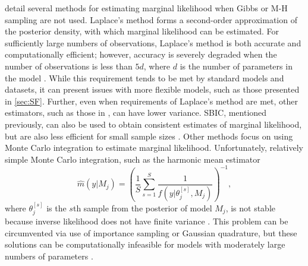 \documentclass[twocolumn]{article}
\begin{document}
\cite{KassRaftery} detail several methods for estimating marginal likelihood when Gibbs or M-H sampling are not used. Laplace's method forms a second-order approximation of the posterior density, with which marginal likelihood can be estimated. For sufficiently large numbers of observations, Laplace's method is both accurate and computationally efficient; however, accuracy is severely degraded when the number of observations is less than $5d$, where $d$ is the number of parameters in the model \citep{Slate}. While this requirement tends to be met by standard models and datasets, it can present issues with more flexible models, such as those presented in \cref{sec:SF}. Further, even when requirements of Laplace's method are met, other estimators, such as those in \cite{Chib}, can have lower variance. SBIC, mentioned previously, can also be used to obtain consistent estimates of marginal likelihood, but are also less efficient for small sample sizes \citep{Bollen}. Other methods focus on using Monte Carlo integration to estimate marginal likelihood. Unfortunately, relatively simple Monte Carlo integration, such as the harmonic mean estimator
\begin{equation}
	\hat{m}(y|M_j) = \left(\frac{1}{S} \sum_{s=1}^S \frac{1}{f(y|\theta_j^{[s]}, M_j)}\right)^{-1},
\end{equation}
where $\theta_j^{[s]}$ is the $s$th sample from the posterior of model $M_j$, is not stable because inverse likelihood does not have finite variance \citep{NewtonRaferty}. This problem can be circumvented via use of importance sampling or Gaussian quadrature, but these solutions can be computationally infeasible for models with moderately large numbers of parameters \citep{GenzKass}.
\end{document}
